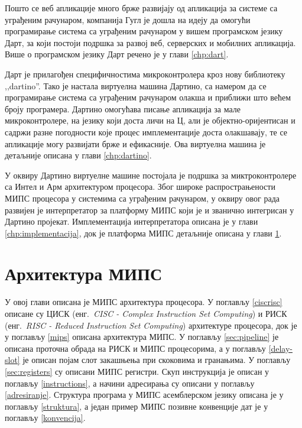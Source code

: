 \documentclass[12pt,oneside]{memoir}
\begin{document}
Пошто се веб апликације много брже развијају од апликација за системе са уграђеним рачунаром, компанија Гугл је дошла на идеју да омогући програмирање система са уграђеним рачунаром у вишем програмском језику Дарт, за који постоји подршка за развој веб, серверских и мобилних апликација. Више о програмском језику Дарт речено је у глави \ref{chp:dart}.

Дарт је прилагођен специфичностима микроконтролера кроз нову библиотеку ,,dartino''. Тако је настала виртуелна машина Дартино, са намером да се програмирање система са уграђеним рачунаром олакша и приближи што већем броју програмера. Дартино омогућава писање апликација за мале микроконтролере, на језику који доста личи на Ц, али је објектно-оријентисан и садржи разне погодности које процес имплементације доста олакшавају, те се апликације могу развијати брже и ефикасније. Ова виртуелна машина је детаљније описана у глави \ref{chp:dartino}.

У оквиру Дартино виртуелне машине постојала је подршка за миктроконтролере са Интел и Арм архитектуром процесора. Због широке распрострањености МИПС процесора у системима са уграђеним рачунаром, у оквиру овог рада развијен је интерпретатор за платформу МИПС који је и званично интегрисан у Дартино пројекат. Имплементација интерпретатора описана је у глави \ref{chp:implementacija}, док је платформа МИПС детаљније описана у глави \ref{chp:mips}.




\chapter{Архитектура МИПС}
\label{chp:mips}
У овој глави описана је МИПС архитектура процесора. У поглављу \ref{ciscrisc} описане су ЦИСК (енг.~\textit{CISC - Complex Instruction Set Computing}) и РИСК (енг.~\textit{RISC - Reduced Instruction Set Computing}) архитектуре процесора, док је у поглављу \ref{mips} описана архитектура МИПС. У поглављу \ref{sec:pipeline} је описана проточна обрада на РИСК и МИПС процесорима, а у поглављу \ref{delay-slot} је описан појам слот закашњења при скоковима и гранањима.  У поглављу \ref{sec:registers} су описани МИПС регистри. Скуп инструкција је описан у поглављу \ref{instructions}, а начини адресирања су описани у поглављу \ref{adresiranje}. Структура програма у МИПС асемблерском језику описана је у поглављу \ref{struktura}, а један пример МИПС позивне конвенције дат је у поглављу \ref{konvencija}.
\end{document}
